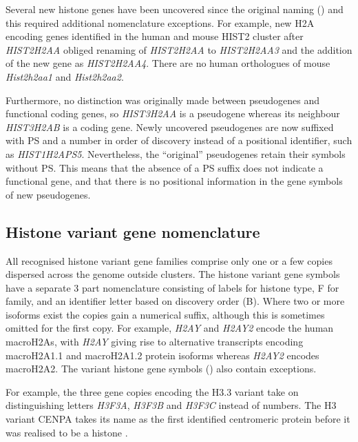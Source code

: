 	Several new histone genes have been uncovered since the original naming () 
	and this required additional nomenclature exceptions.
	For example, new H2A encoding genes identified in the human and mouse HIST2 cluster after \textit{HIST2H2AA} 
	obliged renaming of \textit{HIST2H2AA} to \textit{HIST2H2AA3} and the addition of the new gene as \textit{HIST2H2AA4}. 
	There are no human orthologues of mouse \textit{Hist2h2aa1} and \textit{Hist2h2aa2}.
	
	Furthermore, no distinction was originally made between pseudogenes and functional coding genes, 
	so \textit{HIST3H2AA} is a pseudogene whereas its neighbour \textit{HIST3H2AB} is a coding gene.
	Newly uncovered pseudogenes are now suffixed with PS and a number in order of discovery 
	instead of a positional identifier, such as \textit{HIST1H2APS5}. 
	Nevertheless, the ``original'' pseudogenes retain their symbols without PS. 
	This means that the absence of a PS suffix does not indicate a functional gene, 
	and that there is no positional information in the gene symbols of new pseudogenes.

  \subsection{Histone variant gene nomenclature}
	
	All recognised histone variant gene families comprise only one or a few copies 
	dispersed across the genome outside clusters.
	The histone variant gene symbols have a separate 3 part nomenclature 
	consisting of labels for histone type, F for family, 
	and an identifier letter based on discovery order (B).
	Where two or more isoforms exist the copies gain a numerical suffix, 
	although this is sometimes omitted for the first copy. 
	For example, \textit{H2AY} and \textit{H2AY2} encode the human macroH2As, 
	with \textit{H2AY} giving rise to alternative transcripts encoding macroH2A1.1 and macroH2A1.2 protein isoforms 
	whereas \textit{H2AY2} encodes macroH2A2.
	The variant histone gene symbols () also contain exceptions.
	
	For example, the three gene copies encoding the H3.3 variant 
	take on distinguishing letters \textit{H3F3A}, \textit{H3F3B} and \textit{H3F3C} instead of numbers. 
	The H3 variant CENPA takes its name as the first identified centromeric protein \cite{CENPA-first-report} 
	before it was realised to be a histone \citep{CENPA-copurifies-histones, CENPA-sequence-analysis}.
	
